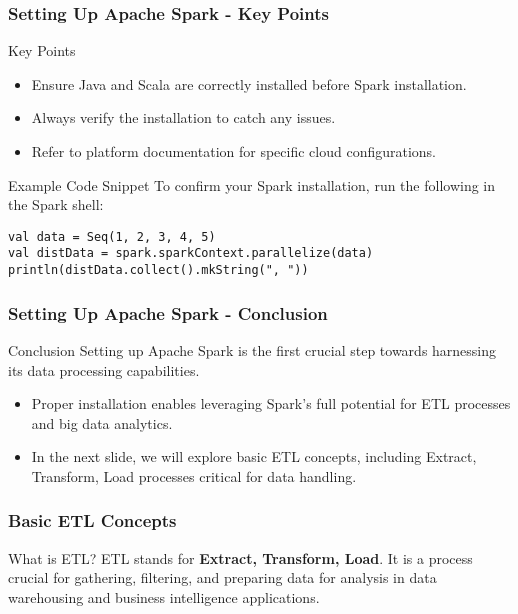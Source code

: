 \documentclass[aspectratio=169]{beamer}
\begin{document}
\begin{frame}[fragile]
    \frametitle{Setting Up Apache Spark - Key Points}
    \begin{block}{Key Points}
        \begin{itemize}
            \item Ensure Java and Scala are correctly installed before Spark installation.
            \item Always verify the installation to catch any issues.
            \item Refer to platform documentation for specific cloud configurations.
        \end{itemize}
    \end{block}

    \begin{block}{Example Code Snippet}
    To confirm your Spark installation, run the following in the Spark shell:
    \begin{lstlisting}
val data = Seq(1, 2, 3, 4, 5)
val distData = spark.sparkContext.parallelize(data)
println(distData.collect().mkString(", "))
    \end{lstlisting}
    \end{block}
\end{frame}

\begin{frame}[fragile]
    \frametitle{Setting Up Apache Spark - Conclusion}
    \begin{block}{Conclusion}
        Setting up Apache Spark is the first crucial step towards harnessing its data processing capabilities.
        \begin{itemize}
            \item Proper installation enables leveraging Spark's full potential for ETL processes and big data analytics.
            \item In the next slide, we will explore basic ETL concepts, including Extract, Transform, Load processes critical for data handling.
        \end{itemize}
    \end{block}
\end{frame}

\begin{frame}
  \frametitle{Basic ETL Concepts}
  \begin{block}{What is ETL?}
    ETL stands for \textbf{Extract, Transform, Load}. It is a process crucial for gathering, filtering, and preparing data for analysis in data warehousing and business intelligence applications.
  \end{block}
\end{frame}
\end{document}
